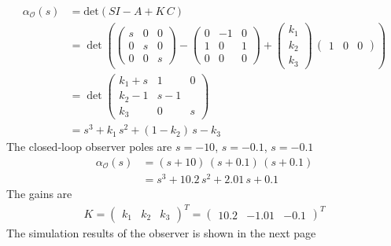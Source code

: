 \begin{align*}
    \alpha_\mathcal{O}(s) &= \text{det}\left(SI - A + K\,C\right) \\
    &=  \det\left(\begin{pmatrix}
        s & 0 & 0 \\ 0 & s & 0 \\ 0 & 0 & s
    \end{pmatrix} - \begin{pmatrix}
        0 & -1 & 0 \\ 1 & 0 & 1 \\ 0 & 0 & 0
    \end{pmatrix} + \begin{pmatrix}
        k_1 \\ k_2 \\ k_3 
    \end{pmatrix}\,\begin{pmatrix}
        1 & 0 & 0
    \end{pmatrix}\right)\\
    &= \det\begin{pmatrix}
        k_1 + s & 1 & 0 \\ k_2 - 1 &  s -1 \\ k_3 & 0 & s
    \end{pmatrix} \\
    &= s^3 + k_1\,s^2 + \left(1 - k_2\right)\,s - k_3
\end{align*}
The closed-loop observer poles are $s = -10$, $s = -0.1$, $s = -0.1$
\begin{align*}
    \alpha_\mathcal{O}(s) &= \left(s + 10\right)\,\left(s + 0.1\right)\,\left(s + 0.1\right) \\
    &= s^3 + 10.2\,s^2 + 2.01\,s + 0.1
\end{align*}
The gains are 
\begin{align*}
    K = \begin{pmatrix}
        k_1 & k_2 & k_3
    \end{pmatrix}^T = \begin{pmatrix}
        10.2 & -1.01 & -0.1
    \end{pmatrix}^T
\end{align*}
The simulation results of the observer is shown in the next page
\clearpage

